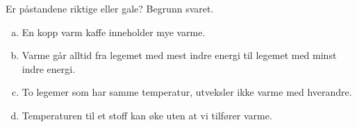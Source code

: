 %
Er påstandene riktige eller gale? Begrunn svaret.
\begin{enumerate}[a)]
    \item En kopp varm kaffe inneholder mye varme.
    \item Varme går alltid fra legemet med mest indre energi til legemet med minst indre energi.
    \item To legemer som har samme temperatur, utveksler ikke varme med hverandre.
    \item Temperaturen til et stoff kan øke uten at vi tilfører varme.
\end{enumerate}
%

